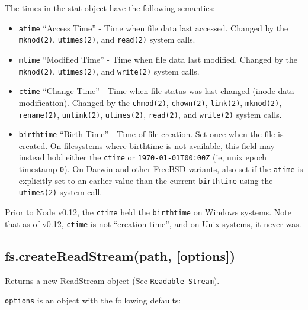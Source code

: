 The times in the stat object have the following semantics:

\begin{itemize}
\itemsep1pt\parskip0pt
\item
  \texttt{atime} ``Access Time'' - Time when file data last accessed.
  Changed by the \texttt{mknod(2)}, \texttt{utimes(2)}, and
  \texttt{read(2)} system calls.
\item
  \texttt{mtime} ``Modified Time'' - Time when file data last modified.
  Changed by the \texttt{mknod(2)}, \texttt{utimes(2)}, and
  \texttt{write(2)} system calls.
\item
  \texttt{ctime} ``Change Time'' - Time when file status was last
  changed (inode data modification). Changed by the \texttt{chmod(2)},
  \texttt{chown(2)}, \texttt{link(2)}, \texttt{mknod(2)},
  \texttt{rename(2)}, \texttt{unlink(2)}, \texttt{utimes(2)},
  \texttt{read(2)}, and \texttt{write(2)} system calls.
\item
  \texttt{birthtime} ``Birth Time'' - Time of file creation. Set once
  when the file is created. On filesystems where birthtime is not
  available, this field may instead hold either the \texttt{ctime} or
  \texttt{1970-01-01T00:00Z} (ie, unix epoch timestamp \texttt{0}). On
  Darwin and other FreeBSD variants, also set if the \texttt{atime} is
  explicitly set to an earlier value than the current \texttt{birthtime}
  using the \texttt{utimes(2)} system call.
\end{itemize}

Prior to Node v0.12, the \texttt{ctime} held the \texttt{birthtime} on
Windows systems. Note that as of v0.12, \texttt{ctime} is not ``creation
time'', and on Unix systems, it never was.

\subsection{fs.createReadStream(path,
{[}options{]})}\label{fs.createreadstreampath-options}

Returns a new ReadStream object (See \texttt{Readable Stream}).

\texttt{options} is an object with the following defaults:

\begin{Shaded}
\begin{Highlighting}[]
\NormalTok{\{ }\NormalTok{: }\NormalTok{,}
  \NormalTok{: }\NormalTok{,}
  \NormalTok{: }\NormalTok{,}
  \NormalTok{: }\NormalTok{,}
  \NormalTok{: }
\NormalTok{\}}
\end{Highlighting}
\end{Shaded}

